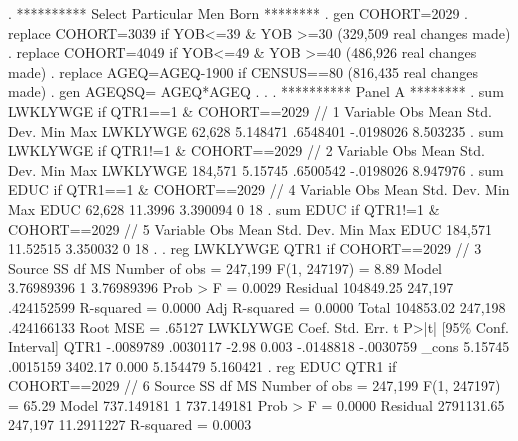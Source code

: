 . **********  Select Particular Men Born ********
. gen COHORT=2029
{\smallskip}
. replace COHORT=3039 if YOB<=39 \& YOB >=30
(329,509 real changes made)
{\smallskip}
. replace COHORT=4049 if YOB<=49 \& YOB >=40
(486,926 real changes made)
{\smallskip}
. replace AGEQ=AGEQ-1900 if CENSUS==80
(816,435 real changes made)
{\smallskip}
. gen AGEQSQ= AGEQ*AGEQ
{\smallskip}
. 
. 
. **********  Panel A ********
. sum LWKLYWGE if QTR1==1 \& COHORT==2029 // 1
{\smallskip}
    Variable {\VBAR}        Obs        Mean    Std. Dev.       Min        Max
    LWKLYWGE {\VBAR}     62,628    5.148471    .6548401  -.0198026   8.503235
{\smallskip}
. sum LWKLYWGE if QTR1!=1 \& COHORT==2029 // 2
{\smallskip}
    Variable {\VBAR}        Obs        Mean    Std. Dev.       Min        Max
    LWKLYWGE {\VBAR}    184,571     5.15745    .6500542  -.0198026   8.947976
{\smallskip}
. sum EDUC if QTR1==1 \& COHORT==2029 // 4
{\smallskip}
    Variable {\VBAR}        Obs        Mean    Std. Dev.       Min        Max
        EDUC {\VBAR}     62,628     11.3996    3.390094          0         18
{\smallskip}
. sum EDUC if QTR1!=1 \& COHORT==2029 // 5
{\smallskip}
    Variable {\VBAR}        Obs        Mean    Std. Dev.       Min        Max
        EDUC {\VBAR}    184,571    11.52515    3.350032          0         18
{\smallskip}
. 
. reg LWKLYWGE QTR1 if COHORT==2029 // 3
{\smallskip}
      Source {\VBAR}       SS           df       MS      Number of obs   =   247,199
   F(1, 247197)    =      8.89
       Model {\VBAR}  3.76989396         1  3.76989396   Prob > F        =    0.0029
    Residual {\VBAR}   104849.25   247,197  .424152599   R-squared       =    0.0000
   Adj R-squared   =    0.0000
       Total {\VBAR}   104853.02   247,198  .424166133   Root MSE        =    .65127
{\smallskip}
    LWKLYWGE {\VBAR}      Coef.   Std. Err.      t    P>|t|     [95\% Conf. Interval]
        QTR1 {\VBAR}  -.0089789   .0030117    -2.98   0.003    -.0148818   -.0030759
       _cons {\VBAR}    5.15745   .0015159  3402.17   0.000     5.154479    5.160421
{\smallskip}
. reg EDUC QTR1 if COHORT==2029 // 6
{\smallskip}
      Source {\VBAR}       SS           df       MS      Number of obs   =   247,199
   F(1, 247197)    =     65.29
       Model {\VBAR}  737.149181         1  737.149181   Prob > F        =    0.0000
    Residual {\VBAR}  2791131.65   247,197  11.2911227   R-squared       =    0.0003
